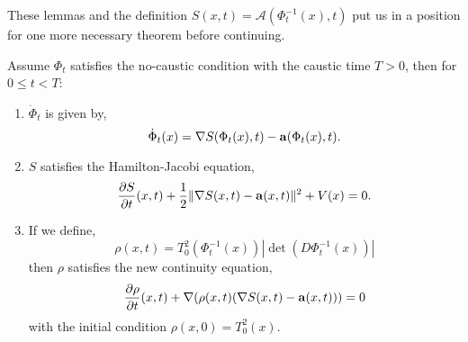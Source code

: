 \documentclass[a4paper,12pt,draft]{report}
\theoremstyle{remark}
\theoremstyle{definition}
\begin{document}
These lemmas and the definition $S(x, t) = \mathscr{A}(\Phi_t^{-1}(x), t)$ put us in a position for one more necessary theorem before continuing.
\theorem
{
Assume $\Phi_t$ satisfies the no-caustic condition with the caustic time $T > 0$, then for $0 \le t < T$:
\begin{enumerate}
\item $\dot{\Phi}_t$ is given by,
$$
\dot{\Phi}_t(x) = \nabla S(\Phi_t(x), t) - \bold{a}(\Phi_t(x), t).
$$
\item $S$ satisfies the Hamilton-Jacobi equation,
\begin{equation}
\frac{\partial S}{\partial t}(x, t) + \frac{1}{2}\|\nabla S(x, t) - \bold{a}(x, t)\|^2 + V(x) = 0. \label{HJE2}
\end{equation}
\item If we define,
$$
\rho(x, t) = T_0^2(\Phi_t^{-1}(x))|\det(D\Phi_t^{-1}(x))|
$$
then $\rho$ satisfies the new continuity equation,
\begin{equation}
\frac{\partial \rho}{\partial t}(x, t) + \nabla(\rho(x, t)(\nabla S(x, t) - \bold{a}(x, t))) = 0 \label{CE2}
\end{equation}
with the initial condition $\rho(x, 0) = T_0^2(x)$.
\end{enumerate}
}
\proof
\end{document}
